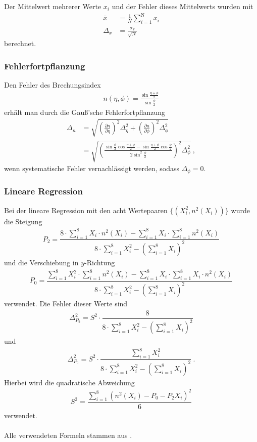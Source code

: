 \label{math:ErrorAver}
\label{math:ErrorBrechindex}
\label{math:QuadrAbw}
\label{math:Regression}
Der Mittelwert mehrerer Werte $x_i$ und der Fehler dieses Mittelwerts wurden mit
\begin{align*}
	\bar{x} &=  \frac{1}{N} \sum_{i=1}^\text{N} x_i \\
	\Delta_{x} &= \frac{\sigma_x}{\sqrt{N}}
\end{align*}
berechnet.
\subsubsection*{Fehlerfortpflanzung}
Den Fehler des Brechungsindex
\begin{align*}
	n(\eta,\phi) = \frac{\sin\frac{\eta+\phi}{2}}{\sin\frac{\phi}{2}}
\end{align*}
 erhält man durch die Gauß'sche Fehlerfortpflanzung
\begin{align*}
	\Delta_n &= \sqrt{\left( \frac{\partial n}{\partial \eta} \right)^2 \Delta_\eta^2 
		+ \left( \frac{\partial n}{\partial \phi} \right)^2 \Delta_\phi^2} \\
	&= \sqrt{\left(\frac{\sin\frac{\phi}{2}\cos\frac{\eta+\phi}{2}-\sin\frac{\eta+\phi}{2}\cos\frac{\phi}{2}}{2\sin^2\frac{\phi}{2}}\right)^2 \Delta_\phi^2} \ ,
\end{align*}
wenn systematische Fehler vernachlässigt werden, sodass $\Delta_\phi=0$.
\subsubsection*{Lineare Regression}
Bei der lineare Regression mit den acht Wertepaaren $\{ (X_i^2, n^2(X_i)) \}$ wurde die Steigung
\begin{align*}
	P_2 = \dfrac{8\cdot\sum\limits_{i=1}^8X_i\cdot n^2(X_i)-\sum\limits_{i=1}^8X_i\cdot\sum\limits_{i=1}^8n^2(X_i)}
	{8\cdot\sum\limits_{i=1}^8X_i^2-\left(\sum\limits_{i=1}^8X_i\right)^2}
\end{align*}
und die Verschiebung in $y$-Richtung
\begin{align*}
	P_0 = \dfrac{\sum\limits_{i=1}^8X_i^2\cdot\sum\limits_{i=1}^8n^2(X_i)-\sum\limits_{i=1}^8X_i\cdot\sum\limits_{i=1}^8X_i\cdot n^2(X_i)}
	 {8\cdot\sum\limits_{i=1}^8X_i^2-\left(\sum\limits_{i=1}^8X_i\right)^2}
\end{align*}
verwendet. Die Fehler dieser Werte sind
\begin{align*}
	\Delta_{P_2}^2 = S^2 \cdot\dfrac{8}{8\cdot\sum\limits_{i=1}^8X_i^2-\left(\sum\limits_{i=1}^8X_i\right)^2}
\end{align*}
und
\begin{align*}
	\Delta_{P_0}^2 = S^2 \cdot \dfrac{\sum\limits_{i=1}^8X_i^2}{8\cdot\sum\limits_{i=1}^8X_i^2-\left(\sum\limits_{i=1}^8X_i\right)^2} \ .
\end{align*}
Hierbei wird die quadratische Abweichung
\begin{align*}
	S^2 = \dfrac{\sum\limits_{i=1}^8\left(n^2(X_i)-P_0-P_2X_i\right)^2}{6}
\end{align*}
verwendet. \\
\ \\
Alle verwendeten Formeln stammen aus \cite[Kap. 1.2.10]{Walcher}.